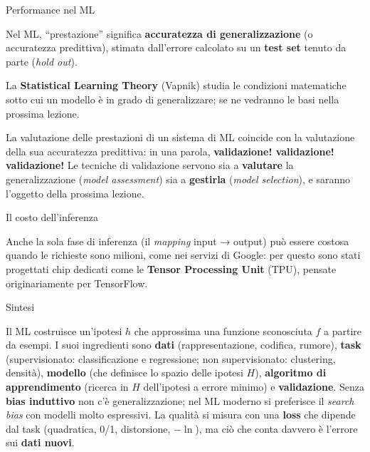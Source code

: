 \begin{boxnote}{Performance nel ML}

Nel ML, ``prestazione'' significa \textbf{accuratezza di
generalizzazione} (o accuratezza predittiva), stimata dall'errore
calcolato su un \textbf{test set} tenuto da parte (\emph{hold out}).

\end{boxnote}

La \textbf{Statistical Learning Theory} (Vapnik) studia le condizioni
matematiche sotto cui un modello è in grado di generalizzare; se ne
vedranno le basi nella prossima lezione.

La valutazione delle prestazioni di un sistema di ML coincide con la
valutazione della sua accuratezza predittiva: in una parola,
\textbf{validazione! validazione! validazione!} Le tecniche di
validazione servono sia a \textbf{valutare} la generalizzazione
(\emph{model assessment}) sia a \textbf{gestirla} (\emph{model
selection}), e saranno l'oggetto della prossima lezione.

\begin{boxnote}{Il costo dell'inferenza}

Anche la sola fase di inferenza (il \emph{mapping} input → output) può
essere costosa quando le richieste sono milioni, come nei servizi di
Google: per questo sono stati progettati chip dedicati come le
\textbf{Tensor Processing Unit} (TPU), pensate originariamente per
TensorFlow.

\end{boxnote}

\begin{boxabstract}{Sintesi}

Il ML costruisce un'ipotesi \(h\) che approssima una funzione
sconosciuta \(f\) a partire da esempi. I suoi ingredienti sono
\textbf{dati} (rappresentazione, codifica, rumore), \textbf{task}
(supervisionato: classificazione e regressione; non supervisionato:
clustering, densità), \textbf{modello} (che definisce lo spazio delle
ipotesi \(H\)), \textbf{algoritmo di apprendimento} (ricerca in \(H\)
dell'ipotesi a errore minimo) e \textbf{validazione}. Senza \textbf{bias
induttivo} non c'è generalizzazione; nel ML moderno si preferisce il
\emph{search bias} con modelli molto espressivi. La qualità si misura
con una \textbf{loss} che dipende dal task (quadratica, 0/1,
distorsione, \(-\ln\)), ma ciò che conta davvero è l'errore sui
\textbf{dati nuovi}.

\end{boxabstract}

